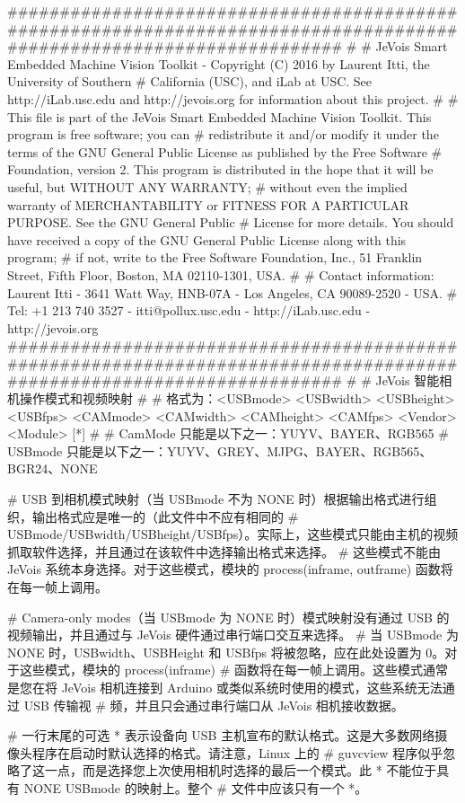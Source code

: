 \begin{DoxyVerb}######################################################################################################################
#
# JeVois Smart Embedded Machine Vision Toolkit - Copyright (C) 2016 by Laurent Itti, the University of Southern
# California (USC), and iLab at USC. See http://iLab.usc.edu and http://jevois.org for information about this project.
#
# This file is part of the JeVois Smart Embedded Machine Vision Toolkit.  This program is free software; you can
# redistribute it and/or modify it under the terms of the GNU General Public License as published by the Free Software
# Foundation, version 2.  This program is distributed in the hope that it will be useful, but WITHOUT ANY WARRANTY;
# without even the implied warranty of MERCHANTABILITY or FITNESS FOR A PARTICULAR PURPOSE.  See the GNU General Public
# License for more details.  You should have received a copy of the GNU General Public License along with this program;
# if not, write to the Free Software Foundation, Inc., 51 Franklin Street, Fifth Floor, Boston, MA 02110-1301, USA.
#
# Contact information: Laurent Itti - 3641 Watt Way, HNB-07A - Los Angeles, CA 90089-2520 - USA.
# Tel: +1 213 740 3527 - itti@pollux.usc.edu - http://iLab.usc.edu - http://jevois.org
######################################################################################################################
#
# JeVois 智能相机操作模式和视频映射 #
# 格式为：<USBmode> <USBwidth> <USBheight> <USBfps> <CAMmode> <CAMwidth> <CAMheight> <CAMfps> <Vendor> <Module> [*] 
#
# CamMode 只能是以下之一：YUYV、BAYER、RGB565
# USBmode 只能是以下之一：YUYV、GREY、MJPG、BAYER、RGB565、BGR24、NONE

# USB 到相机模式映射（当 USBmode 不为 NONE 时）根据输出格式进行组织，输出格式应是唯一的（此文件中不应有相同的 
# USBmode/USBwidth/USBheight/USBfps）。实际上，这些模式只能由主机的视频抓取软件选择，并且通过在该软件中选择输出格式来选择。
# 这些模式不能由 JeVois 系统本身选择。对于这些模式，模块的 process(inframe, outframe) 函数将在每一帧上调用。

# Camera-only modes（当 USBmode 为 NONE 时）模式映射没有通过 USB 的视频输出，并且通过与 JeVois 硬件通过串行端口交互来选择。
# 当 USBmode 为 NONE 时，USBwidth、USBHeight 和 USBfps 将被忽略，应在此处设置为 0。对于这些模式，模块的 process(inframe) 
# 函数将在每一帧上调用。这些模式通常是您在将 JeVois 相机连接到 Arduino 或类似系统时使用的模式，这些系统无法通过 USB 传输视
# 频，并且只会通过串行端口从 JeVois 相机接收数据。

# 一行末尾的可选 * 表示设备向 USB 主机宣布的默认格式。这是大多数网络摄像头程序在启动时默认选择的格式。请注意，Linux 上的 
# guvcview 程序似乎忽略了这一点，而是选择您上次使用相机时选择的最后一个模式。此 * 不能位于具有 NONE USBmode 的映射上。整个
# 文件中应该只有一个 *。


\end{DoxyVerb}
